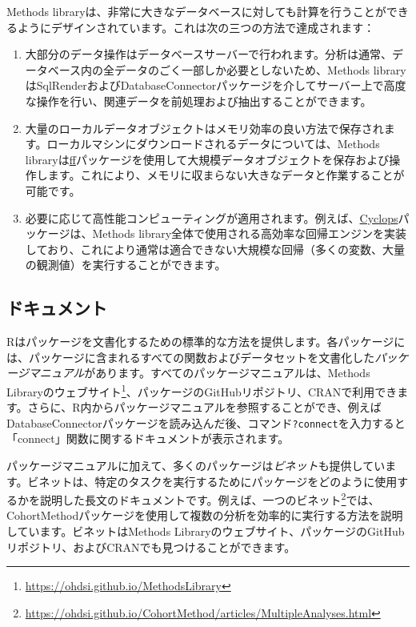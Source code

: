 \documentclass[
  11pt]{book}
\providecommand{\tightlist}{%
  \setlength{\itemsep}{0pt}\setlength{\parskip}{0pt}}
\theoremstyle{definition}
\theoremstyle{definition}
\theoremstyle{definition}
\theoremstyle{definition}
\theoremstyle{remark}
\begin{document}
Methods libraryは、非常に大きなデータベースに対しても計算を行うことができるようにデザインされています。これは次の三つの方法で達成されます：

\begin{enumerate}
\def\labelenumi{\arabic{enumi}.}
\tightlist
\item
  大部分のデータ操作はデータベースサーバーで行われます。分析は通常、データベース内の全データのごく一部しか必要としないため、Methods libraryはSqlRenderおよびDatabaseConnectorパッケージを介してサーバー上で高度な操作を行い、関連データを前処理および抽出することができます。
\item
  大量のローカルデータオブジェクトはメモリ効率の良い方法で保存されます。ローカルマシンにダウンロードされるデータについては、Methods libraryは\href{https://cran.r-project.org/web/packages/ff}{ff}パッケージを使用して大規模データオブジェクトを保存および操作します。これにより、メモリに収まらない大きなデータと作業することが可能です。
\item
  必要に応じて高性能コンピューティングが適用されます。例えば、\href{https://ohdsi.github.io/Cyclops/}{Cyclops}パッケージは、Methods library全体で使用される高効率な回帰エンジンを実装しており、これにより通常は適合できない大規模な回帰（多くの変数、大量の観測値）を実行することができます。
\end{enumerate}

\subsection{ドキュメント}\label{ux30c9ux30adux30e5ux30e1ux30f3ux30c8-1}

Rはパッケージを文書化するための標準的な方法を提供します。各パッケージには、パッケージに含まれるすべての関数およびデータセットを文書化した\emph{パッケージマニュアル}があります。すべてのパッケージマニュアルは、Methods Libraryのウェブサイト\footnote{\url{https://ohdsi.github.io/MethodsLibrary}}、パッケージのGitHubリポジトリ、CRANで利用できます。さらに、R内からパッケージマニュアルを参照することができ、例えばDatabaseConnectorパッケージを読み込んだ後、コマンド\texttt{?connect}を入力すると「connect」関数に関するドキュメントが表示されます。

パッケージマニュアルに加えて、多くのパッケージは\emph{ビネット}も提供しています。ビネットは、特定のタスクを実行するためにパッケージをどのように使用するかを説明した長文のドキュメントです。例えば、一つのビネット\footnote{\url{https://ohdsi.github.io/CohortMethod/articles/MultipleAnalyses.html}}では、CohortMethodパッケージを使用して複数の分析を効率的に実行する方法を説明しています。ビネットはMethods Libraryのウェブサイト、パッケージのGitHubリポジトリ、およびCRANでも見つけることができます。 
\end{document}
